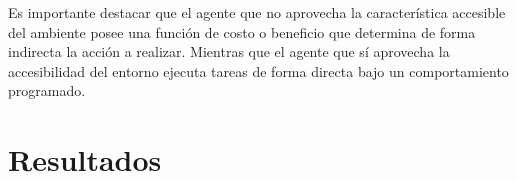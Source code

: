 \documentclass[a4paper,10pt,twocolumn]{article}
\begin{document}
	Es importante destacar que el agente que no aprovecha la característica accesible del ambiente posee una función de costo o beneficio que determina de forma indirecta la acción a realizar. Mientras que el agente que sí aprovecha la accesibilidad del entorno ejecuta tareas de forma directa bajo un comportamiento programado.
	
\section{Resultados}





\label{end}
\end{document}
